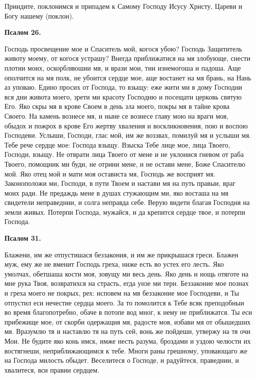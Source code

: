 Приидите, поклонимся и припадем к Самому Господу Исусу Христу, Цареви и Богу нашему (поклон).


\medskip


\bfseries Псалом 26.\normalfont{}


Господь просвещение мое и Спаситель мой, когося убою? Господь Защититель животу моему, от когося устрашу? Внегда приближатися на мя злобующе, снести плотии моих, оскорбляюшии мя, и врази мои, тии изнемогоша и падоша. Аще ополчится на мя полк, не убоится сердце мое, аще востанет на мя брань, на Нань аз уповаю. Едино просих от Господа, то взыщу: еже жити ми в дому Господни вся дни живота моего, зрети ми красоту Господню и посещати церковь святую Его. Яко скры мя в крове Своем в день зла моего, покры мя в тайне крова Своего. На камень вознесе мя, и ныне се вознесе главу мою на враги моя, обыдох и пожрох в крове Его жертву хваления и воскликновения, пою и воспою Господеви. Услыши, Господи, глас мой, им же воззвах, помилуй мя и услыши мя. Тебе рече сердце мое: Господа взыщу. Взыска Тебе лице мое, лица Твоего, Господи, взыщу. Не отврати лица Твоего от мене и не уклонися гневом от раба Твоего, помощник ми буди, не отрини мене, и не остави мене, Боже Спасителю мой. Яко отец мой и мати моя остависта мя, Господь же восприят мя. Законоположи ми, Господи, в пути Твоем и настави мя на путь правыи,  враг моих ради. Не предаждь мене в душах стужающим ми, яко восташа на мя свидетели неправеднии, и солга неправда себе. Верую видети благая Господня на земли живых. Потерпи Господа, мужайся, и да крепится сердце твое, и потерпи Господа.


\medskip


\bfseries Псалом 31.\normalfont{}


Блажени, им же отпустишася беззакония, и им же прикрышася греси. Блажен муж, ему же не вменит Господь греха, ниже есть во устех его лесть. Яко умолчах, обетшаша кости моя, зовущу ми весь день. Яко день и нощь отяготе на мне рука Твоя, возвратихся на страсть, егда унзе ми терн. Беззаконие мое познах и греха моего не покрых, рех: исповем на мя беззаконие мое Господеви, и Ты отпустил еси нечестие сердца моего. За то помолится к Тебе всяк преподобныи во время благопотребно, обаче в потопе вод мног, к нему не приближатся. Ты еси прибежище мое, от скорби одержащия мя, радосте моя, избави мя от обышедших мя. Вразумлю тя и наставлю тя на путь сей, вонь же пойдеши, утвержу на тя очи Мои. Не будите яко конь имск, имже несть разума, броздами и уздою челюсти их востягнеши, неприближающимся к тебе. Многи раны грешному, уповающаго же на Господа милость обыдет. Веселитеся о Господе, и радуйтеся, праведнии, и хвалитеся, вси правии сердцем.


